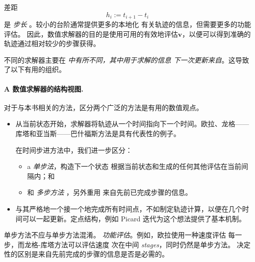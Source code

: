 差距
\[
h_i:=t_{i+1}-t_i
\]
是 \emph{ 步长 }。较小的台阶通常提供更多的本地化
有关轨迹的信息，但需要更多的功能评估。
因此，数值求解器的目的是使用可用的有效地评估$\mathbf{v}$，以便可以得到准确的轨迹通过相对较少的步骤获得。

不同的求解器主要在 \emph{ 中有所不同，其中用于求解的信息
下一次更新来自}。这导致了以下有用的组织。

\paragraph{A 数值求解器的结构视图.}
对于与本书相关的方法，区分两个广泛的方法是有用的数值观点。

\begin{itemize}
    \item {}
    从当前状态开始，求解器将轨迹从一个时间指向下一个时间。欧拉、龙格——库塔和亚当斯——巴什福斯方法是具有代表性的例子。

    在时间步进方法中，我们进一步区分：
    \begin{itemize}
        \item a \emph{单步法}，构造下一个状态
        根据当前状态和生成的任何其他评估在当前间隔内；和

        \item 和 \emph{ 多步方法 }，另外重用
        来自先前已完成步骤的信息。
    \end{itemize}

    \item {}
    与其严格地一个接一个地完成所有时间点，不如制定轨迹计算，以便在几个时间可以一起更新。定点结构，例如 Picard
    迭代为这个想法提供了基本机制。
\end{itemize}单步方法不应与单步方法混淆。
\emph{功能评估}。例如，欧拉使用一种速度评估
每一步，而龙格-库塔方法可以评估速度
次在中间 \emph{stages}，同时仍然是单步方法。
决定性的区别是来自先前完成的步骤的信息是否是必需的。


